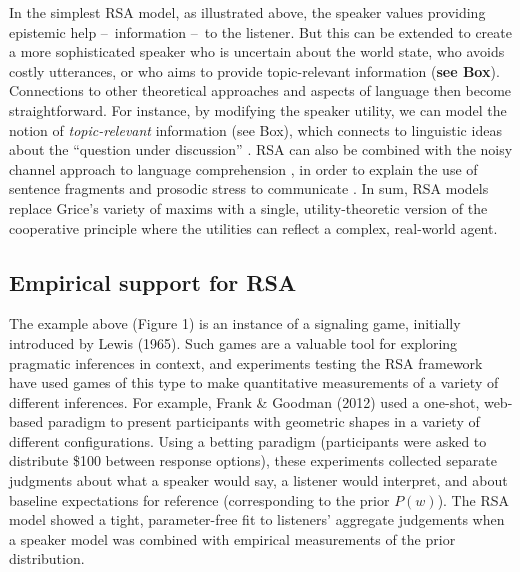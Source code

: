 \documentclass[]{elsarticle}
\begin{document}
In the simplest RSA model, as illustrated above, the speaker values
providing epistemic help --~information --~to the listener. But this can
be extended to create a more sophisticated speaker who is uncertain
about the world state, who avoids costly utterances, or who aims to
provide topic-relevant information (\textbf{see Box}). Connections to
other theoretical approaches and aspects of language then become
straightforward. For instance, by modifying the speaker utility, we can
model the notion of \emph{topic-relevant} information (see Box), which
connects to linguistic ideas about the ``question under discussion''
\cite{Roberts}. RSA can also be combined with the noisy
channel approach to language comprehension \cite{levy},
in order to explain the use of sentence fragments and prosodic stress to
communicate \cite{bergengoodman}. In sum, RSA models
replace Grice's variety of maxims with a single, utility-theoretic
version of the cooperative principle where the utilities can reflect a
complex, real-world agent.

\subsection{Empirical support for RSA }\label{empirical-support-for-rsa}

The example above (Figure 1) is an instance of a signaling game,
initially introduced by Lewis (1965). Such games are a valuable tool for
exploring pragmatic inferences in context, and experiments testing the
RSA framework have used games of this type to make quantitative
measurements of a variety of different inferences. For example, Frank \&
Goodman (2012) used a one-shot, web-based paradigm to present
participants with geometric shapes in a variety of different
configurations. Using a betting paradigm (participants were asked to
distribute \$100 between response options), these experiments collected
separate judgments about what a speaker would say, a listener would
interpret, and about baseline expectations for reference (corresponding
to the prior $P(w)$). The RSA model showed a tight, parameter-free fit
to listeners' aggregate judgements when a speaker model was combined
with empirical measurements of the prior distribution.
\end{document}
